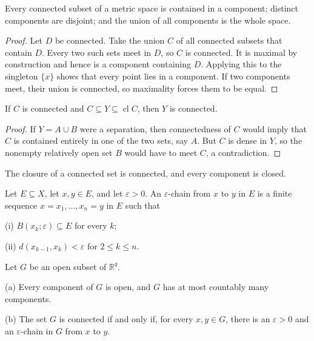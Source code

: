 \begin{thm}
Every connected subset of a metric space is contained in a component;
distinct components are disjoint; and the union of all components is the
whole space.
\end{thm}

\begin{proof}
Let $D$ be connected. Take the union $C$ of all connected subsets that contain
$D$. Every two such sets meet in $D$, so $C$ is connected. It is maximal by
construction and hence is a component containing $D$. Applying this to the
singleton $\{x\}$ shows that every point lies in a component. If two
components meet, their union is connected, so maximality forces them to be
equal.
\end{proof}

\begin{thm}
If $C$ is connected and
$C\subseteq Y\subseteq\operatorname{cl}C$, then $Y$ is connected.
\end{thm}

\begin{proof}
If $Y=A\cup B$ were a separation, then connectedness of $C$ would imply that
$C$ is contained entirely in one of the two sets, say $A$. But $C$ is dense
in $Y$, so the nonempty relatively open set $B$ would have to meet $C$, a
contradiction.
\end{proof}

\begin{cor}
The closure of a connected set is connected, and every component is closed.
\end{cor}

\begin{de}
Let $E\subseteq X$, let $x,y\in E$, and let $\varepsilon>0$. An
$\varepsilon$-chain from $x$ to $y$ in $E$ is a finite sequence
$x=x_1,\ldots,x_n=y$ in $E$ such that

(i) $B(x_k;\varepsilon)\subseteq E$ for every $k$;

(ii) $d(x_{k-1},x_k)<\varepsilon$ for $2\leq k\leq n$.
\end{de}

\begin{thm}
Let $G$ be an open subset of $\mathbb{R}^q$.

(a) Every component of $G$ is open, and $G$ has at most countably many
components.

(b) The set $G$ is connected if and only if, for every $x,y\in G$, there is
an $\varepsilon>0$ and an $\varepsilon$-chain in $G$ from $x$ to $y$.
\end{thm}


